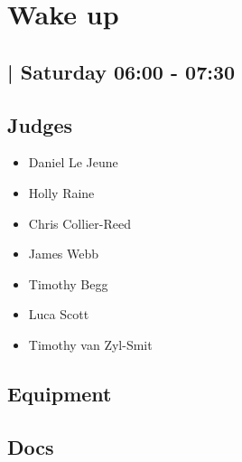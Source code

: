\documentclass[10pt]{article}
\begin{document}
		\begin{minipage}{\linewidth}
		\setcounter{section}{10}
	\section{Wake up }
	\subsection*{ | Saturday 06:00 - 07:30}

	

	\begin{multicols}{2}
	\subsection*{\faUsers \: Judges}
	\begin{itemize}
			\item Daniel Le Jeune
			\item Holly Raine
			\item Chris Collier-Reed
			\item James Webb
			\item Timothy Begg
			\item Luca Scott
			\item Timothy van Zyl-Smit
		\end{itemize}
	\columnbreak
	\subsection*{\faWrench \: Equipment}
	        \vfill\null
        \subsection*{\faFile \: Docs}
     	\end{multicols}


	\vspace{1cm}
	\end{minipage}
\end{document}
